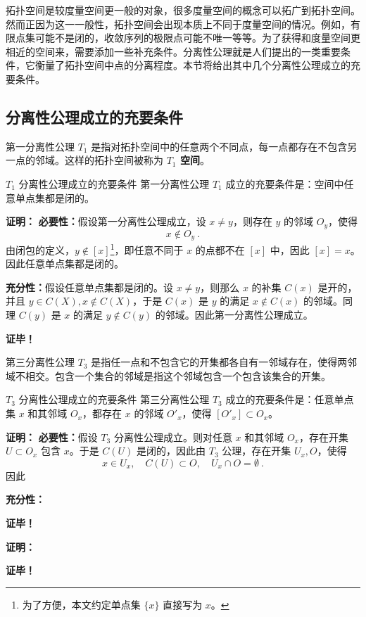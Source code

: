 
拓扑空间是较度量空间更一般的对象，很多度量空间的概念可以拓广到拓扑空间。然而正因为这一一般性，拓扑空间会出现本质上不同于度量空间的情况。例如，有限点集可能不是闭的，收敛序列的极限点可能不唯一等等。为了获得和度量空间更相近的空间来，需要添加一些补充条件。分离性公理就是人们提出的一类重要条件，它衡量了拓扑空间中点的分离程度。本节将给出其中几个分离性公理成立的充要条件。

\subsection{分离性公理成立的充要条件}
第一分离性公理 $T_1$ 是指对拓扑空间中的任意两个不同点，每一点都存在不包含另一点的邻域。这样的拓扑空间被称为\textbf{ $T_1$ 空间}。
\begin{theorem}{$T_1$ 分离性公理成立的充要条件}
第一分离性公理 $T_1$ 成立的充要条件是：空间中任意单点集都是闭的。
\end{theorem}
\textbf{证明：}
\textbf{必要性：}假设第一分离性公理成立，设 $x\neq y$，则存在 $y$ 的邻域 $O_y$，使得
\begin{equation}
x\notin O_y~.
\end{equation}
由闭包的定义，$y\notin [x]$\footnote{为了方便，本文约定单点集 $\{x\}$ 直接写为 $x$。}，即任意不同于 $x$ 的点都不在 $[x]$ 中，因此 $[x]=x$。因此任意单点集都是闭的。

\textbf{充分性：}假设任意单点集都是闭的。设 $x\neq y$，则那么 $x$ 的补集 $C(x)$ 是开的，并且 $y\in C(X),x\notin C(X)$，于是 $C(x)$ 是 $y$ 的满足 $x\notin C(x)$ 的邻域。同理 $C(y)$ 是 $x$ 的满足 $y\notin C(y)$ 的邻域。因此第一分离性公理成立。

\textbf{证毕！}



第三分离性公理 $T_3$ 是指任一点和不包含它的开集都各自有一邻域存在，使得两邻域不相交。包含一个集合的邻域是指这个邻域包含一个包含该集合的开集。


\begin{theorem}{$T_3$ 分离性公理成立的充要条件}
第三分离性公理 $T_3$ 成立的充要条件是：任意单点集 $x$ 和其邻域 $O_x$，都存在 $x$ 的邻域 $ O'_x$，使得 $[O'_x]\subset O_x$。
\end{theorem}

\textbf{证明：}
\textbf{必要性：}假设 $T_3$ 分离性公理成立。则对任意 $x$ 和其邻域 $O_x$，存在开集 $U\subset O_x$ 包含 $x$。于是 $C(U)$ 是闭的，因此由 $T_3$ 公理，存在开集 $U_x, O$，使得
\begin{equation}
x\in U_x,\quad C(U)\subset O,\quad U_x\cap O=\emptyset~.
\end{equation}
因此

\textbf{充分性：}

\textbf{证毕！}









\textbf{证明：}


\textbf{证毕！}




